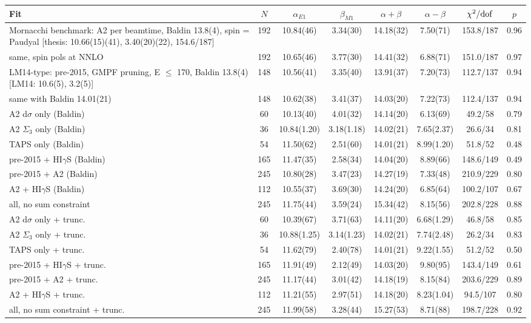 \begin{tabular}{lccccccc}
\hline
Fit & $N$ & $\alpha_{E1}$ & $\beta_{M1}$ & $\alpha+\beta$ & $\alpha-\beta$ & $\chi^2/{\rm dof}$ & $p$ \\
\hline
Mornacchi benchmark: A2 per beamtime, Baldin 13.8(4), spin = Paudyal [thesis: 10.66(15)(41), 3.40(20)(22), 154.6/187] & 192 & 10.84(46) & 3.34(30) & 14.18(32) & 7.50(71) & 153.8/187 & 0.96 \\
same, spin pols at NNLO & 192 & 10.65(46) & 3.77(30) & 14.41(32) & 6.88(71) & 151.0/187 & 0.97 \\
LM14-type: pre-2015, GMPF pruning, E $\le$ 170, Baldin 13.8(4) [LM14: 10.6(5), 3.2(5)] & 148 & 10.56(41) & 3.35(40) & 13.91(37) & 7.20(73) & 112.7/137 & 0.94 \\
same with Baldin 14.01(21) & 148 & 10.62(38) & 3.41(37) & 14.03(20) & 7.22(73) & 112.4/137 & 0.94 \\
A2 d$\sigma$ only (Baldin) & 60 & 10.13(40) & 4.01(32) & 14.14(20) & 6.13(69) & 49.2/58 & 0.79 \\
A2 $\Sigma_3$ only (Baldin) & 36 & 10.84(1.20) & 3.18(1.18) & 14.02(21) & 7.65(2.37) & 26.6/34 & 0.81 \\
TAPS only (Baldin) & 54 & 11.50(62) & 2.51(60) & 14.01(21) & 8.99(1.20) & 51.8/52 & 0.48 \\
pre-2015 + HI$\gamma$S (Baldin) & 165 & 11.47(35) & 2.58(34) & 14.04(20) & 8.89(66) & 148.6/149 & 0.49 \\
pre-2015 + A2 (Baldin) & 245 & 10.80(28) & 3.47(23) & 14.27(19) & 7.33(48) & 210.9/229 & 0.80 \\
A2 + HI$\gamma$S (Baldin) & 112 & 10.55(37) & 3.69(30) & 14.24(20) & 6.85(64) & 100.2/107 & 0.67 \\
all, no sum constraint & 245 & 11.75(44) & 3.59(24) & 15.34(42) & 8.15(56) & 202.8/228 & 0.88 \\
A2 d$\sigma$ only + trunc. & 60 & 10.39(67) & 3.71(63) & 14.11(20) & 6.68(1.29) & 46.8/58 & 0.85 \\
A2 $\Sigma_3$ only + trunc. & 36 & 10.88(1.25) & 3.14(1.23) & 14.02(21) & 7.74(2.48) & 26.2/34 & 0.83 \\
TAPS only + trunc. & 54 & 11.62(79) & 2.40(78) & 14.01(21) & 9.22(1.55) & 51.2/52 & 0.50 \\
pre-2015 + HI$\gamma$S + trunc. & 165 & 11.91(49) & 2.12(49) & 14.03(20) & 9.80(95) & 143.4/149 & 0.61 \\
pre-2015 + A2 + trunc. & 245 & 11.17(44) & 3.01(42) & 14.18(19) & 8.15(84) & 203.6/229 & 0.89 \\
A2 + HI$\gamma$S + trunc. & 112 & 11.21(55) & 2.97(51) & 14.18(20) & 8.23(1.04) & 94.5/107 & 0.80 \\
all, no sum constraint + trunc. & 245 & 11.99(58) & 3.28(44) & 15.27(53) & 8.71(88) & 198.7/228 & 0.92 \\
\hline
\end{tabular}
